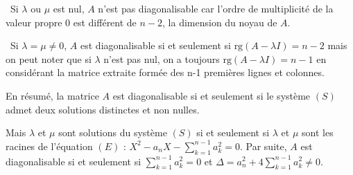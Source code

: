 {{\textbullet~Si $\lambda$ ou $\mu$ est nul, $A$ n'est  pas diagonalisable car l'ordre de multiplicité de la valeur propre $0$ est différent de $n-2$, la dimension du noyau de $A$.

\textbullet~Si $\lambda=\mu\neq 0$, $A$ est diagonalisable si et seulement si $\text{rg}(A-\lambda I) = n-2$ mais on peut noter que si $\lambda$ n'est pas nul, on a toujours $\text{rg}(A-\lambda I)= n-1$ en considérant la matrice extraite formée des n-1 premières lignes et colonnes.

En résumé, la matrice $A$ est diagonalisable si et seulement si le système $(S)$ admet deux solutions distinctes et non nulles.

Mais $\lambda$ et $\mu$ sont solutions du système $(S)$ si et seulement si $\lambda$ et $\mu$ sont les racines de l'équation $(E)$ : $X^2 - a_nX- \sum_{k=1}^{n-1}a_k^2 = 0$. Par suite, $A$ est diagonalisable si et seulement si $\sum_{k=1}^{n-1}a_k^2 = 0$ et $\Delta= a_n^2+4\sum_{k=1}^{n-1}a_k^2\neq0$.
}
}
